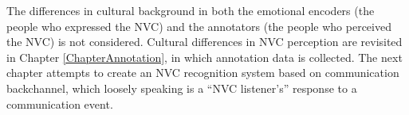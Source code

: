 The differences in cultural background in both the emotional encoders (the people who expressed the \ac{NVC}) and the annotators (the people who perceived the \ac{NVC}) is not considered. Cultural differences in \ac{NVC} perception are revisited in Chapter \ref{ChapterAnnotation}, in which \culturallySpecific annotation data is collected. 
The next chapter attempts to create an \ac{NVC} recognition system based on communication backchannel, which loosely speaking is a ``\ac{NVC} listener's'' response to a communication event.
